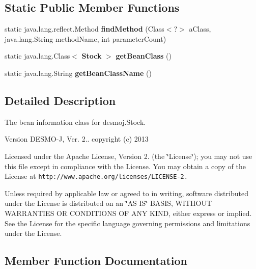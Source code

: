 \subsection*{Static Public Member Functions}
\begin{DoxyCompactItemize}
\item 
static java.\-lang.\-reflect.\-Method {\bf find\-Method} (Class$<$?$>$ a\-Class, java.\-lang.\-String method\-Name, int parameter\-Count)
\item 
static java.\-lang.\-Class$<$ {\bf Stock} $>$ {\bf get\-Bean\-Class} ()
\item 
static java.\-lang.\-String {\bf get\-Bean\-Class\-Name} ()
\end{DoxyCompactItemize}


\subsection{Detailed Description}
The bean information class for desmoj.\-Stock.

\begin{DoxyVersion}{Version}
D\-E\-S\-M\-O-\/\-J, Ver. 2.. copyright (c) 2013
\end{DoxyVersion}
Licensed under the Apache License, Version 2. (the \char`\"{}\-License\char`\"{}); you may not use this file except in compliance with the License. You may obtain a copy of the License at {\tt http\-://www.\-apache.\-org/licenses/\-L\-I\-C\-E\-N\-S\-E-\/2.}

Unless required by applicable law or agreed to in writing, software distributed under the License is distributed on an \char`\"{}\-A\-S I\-S\char`\"{} B\-A\-S\-I\-S, W\-I\-T\-H\-O\-U\-T W\-A\-R\-R\-A\-N\-T\-I\-E\-S O\-R C\-O\-N\-D\-I\-T\-I\-O\-N\-S O\-F A\-N\-Y K\-I\-N\-D, either express or implied. See the License for the specific language governing permissions and limitations under the License. 

\subsection{Member Function Documentation}
